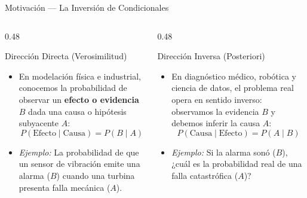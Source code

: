 \documentclass[10pt, aspectratio=169]{beamer}
\begin{document}
\begin{frame}{Motivación --- La Inversión de Condicionales}
  \begin{columns}[T]
    \begin{column}{0.48\textwidth}
      \begin{block}{Dirección Directa (Verosimilitud)}
        \small
        \begin{itemize}\itemsep=0.1cm
          \item En modelación física e industrial, conocemos la probabilidad de observar un \textbf{efecto o evidencia} $B$ dada una causa o hipótesis subyacente $A$:
          $$P(\text{Efecto} \mid \text{Causa}) = P(B \mid A)$$
          \item \emph{Ejemplo:} La probabilidad de que un sensor de vibración emite una alarma ($B$) cuando una turbina presenta falla mecánica ($A$).
        \end{itemize}
      \end{block}
    \end{column}
    \begin{column}{0.48\textwidth}
      \begin{alertblock}{Dirección Inversa (Posteriori)}
        \small
        \begin{itemize}\itemsep=0.1cm
          \item En diagnóstico médico, robótica y ciencia de datos, el problema real opera en sentido inverso: observamos la evidencia $B$ y debemos inferir la causa $A$:
          $$P(\text{Causa} \mid \text{Efecto}) = P(A \mid B)$$
          \item \emph{Ejemplo:} Si la alarma sonó ($B$), ¿cuál es la probabilidad real de una falla catastrófica ($A$)?
        \end{itemize}
      \end{alertblock}
    \end{column}
  \end{columns}
\end{frame}
\end{document}

